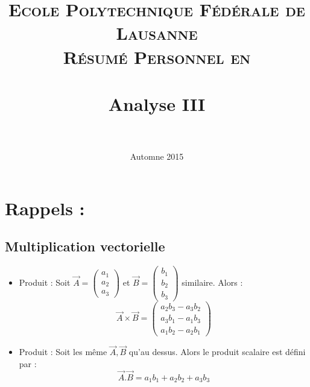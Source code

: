 \documentclass[12pt,a4paper]{article}
\date{Automne 2015}
\title{	
\normalfont \normalsize 
\textsc{Ecole Polytechnique Fédérale de Lausanne} \\ [25pt] %
\textsc{Résumé Personnel en }\\ [0pt] %
\horrule{0.5pt} \\[0.4cm] %
\huge Analyse III\\ %
\horrule{2pt} \\[0.5cm] %
}
\begin{document}
\maketitle
\newpage
\tableofcontents
{}
\newcommand{\coss}[1]{\ensuremath{\cos\left(#1\))}}
\newcommand{\sinn}[1]{\ensuremath{\sin\left((#1\))}}
\renewcommand{\(}{\left(}
\renewcommand{\)}{\right)}
\newcommand{\dive}{\text{ div }}
\newcommand{\rot}{\text{ rot }}
\newcommand{\grad}{\text{ grad }}

\section{Rappels :}
\subsection{Multiplication vectorielle}
\begin{itemize}
	\item Produit  : Soit $\vec{A} = \begin{pmatrix}a_1 \\ a_2 \\ a_3 \end{pmatrix}$ et $\vec{B} = \begin{pmatrix}b_1 \\ b_2 \\ b_3 \end{pmatrix}$ similaire. Alors : \[\vec{A}\times \vec{B} = \begin{pmatrix} a_2b_3 - a_3b_2 \\ a_3b_1 - a_1b_3 \\ a_1b_2 - a_2b_1 \end{pmatrix}\]
	\item Produit  : Soit les même $\vec{A}, \vec{B}$ qu'au dessus. Alors le produit scalaire est défini par : \[\vec{A}.\vec{B} = a_1b_1 + a_2b_2 + a_3b_3\]
\end{itemize}
\end{document}
